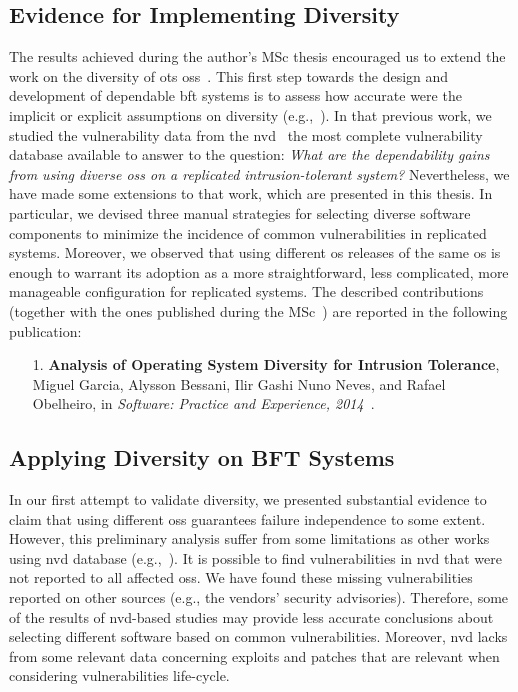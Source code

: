 \subsection{Evidence for Implementing Diversity}%


The results achieved during the author's MSc thesis encouraged us to extend the work on the diversity of \gls{ots} \glspl{os}~\cite{Garcia:2012}.
This first step towards the design and development of dependable \gls{bft} systems is to assess how accurate were the implicit or explicit assumptions on diversity (e.g.,~\cite{Abd-El-Malek:2005,Bessani:2008,Castro:2002,Castro:2003,Clement:2009,Correia:2004,Kapitza:2012,Kotla:2010,Moniz:2011,Yin:2003}).
In that previous work, we studied the vulnerability data from the \gls{nvd}~\cite{nvd} the most complete vulnerability database available to answer to the question:
\emph{What are the dependability gains from using diverse \glspl{os} on a replicated  intrusion-tolerant system?} 
Nevertheless, we have made some extensions to that work, which are presented in this thesis.
In particular, we devised three manual strategies for selecting diverse software components to minimize the incidence of common vulnerabilities in replicated systems.
Moreover, we observed that using different \gls{os} releases of the same \gls{os} is enough to warrant its adoption as a more straightforward, less complicated, more manageable configuration for replicated systems.
The described contributions (together with the ones published during the MSc~\cite{Garcia:2012}) are reported in the following publication:

\begin{enumerate}
\item[1.] \textbf{Analysis of Operating System Diversity for Intrusion Tolerance}, Miguel Garcia, Alysson Bessani, Ilir Gashi Nuno Neves, and Rafael Obelheiro, in \emph{Software: Practice and Experience, 2014}~\cite{Garcia:2014}.
\end{enumerate}



\subsection{Applying Diversity on BFT Systems}
In our first attempt to validate diversity, we presented substantial evidence to claim that using different \glspl{os} guarantees failure independence to some extent.
However, this preliminary analysis suffer from some limitations as other works using \gls{nvd} database (e.g.,~\cite{Han:2009,Frei:2010,Shahzad:2012,Bozorgi:2010,Allodi:2014,Gorbenko:2017}).
It is possible to find vulnerabilities in \gls{nvd} that were not reported to all affected \glspl{os}.
We have found these missing vulnerabilities reported on other sources (e.g., the vendors' security advisories).
Therefore, some of the results of \gls{nvd}-based studies may provide less accurate conclusions about selecting different software based on common vulnerabilities.
Moreover, \gls{nvd} lacks from some relevant data concerning exploits and patches that are relevant when considering vulnerabilities life-cycle.

